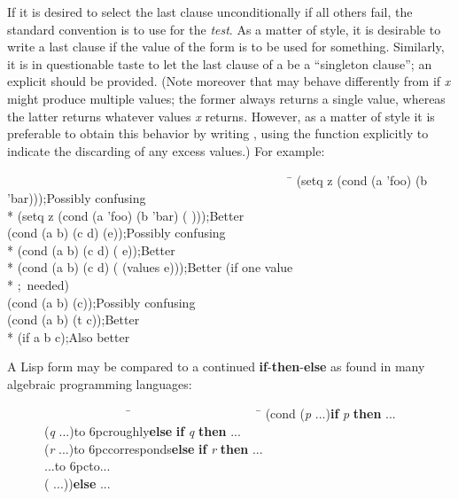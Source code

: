 \begin{defmac}
If it is desired to select the last clause unconditionally if all others
fail, the standard convention is to use {\true} for the \emph{test}.
As a matter of style, it is desirable to write a last clause
\cd{({\true} {\false})} if the value of the  form is to be used
for something.  Similarly, it is in questionable
taste to let the last clause of
a  be a ``singleton clause''; an explicit {\true} should be provided.
(Note moreover that  may behave differently from
 if \emph{x} might produce multiple values;
the former always returns a single value, whereas the latter returns whatever
values \emph{x} returns.  However, as a matter of style it is preferable
to obtain this behavior by writing ,
using the  function explicitly to indicate the discarding
of any excess values.)
For example:
\begin{lisp}
~~~~~~~~~~~~~~~~~~~~~~~~~~~~~~~~~~~~~~~~~~~~~~\=\kill
(setq z (cond (a 'foo) (b 'bar)))\>;\textrm{Possibly confusing} \\*
(setq z (cond (a 'foo) (b 'bar) ({\true} {\false})))\>;\textrm{Better} \\
(cond (a b) (c d) (e))\>;\textrm{Possibly confusing} \\*
(cond (a b) (c d) ({\true} e))\>;\textrm{Better} \\*
(cond (a b) (c d) ({\true} (values e)))\>;\textrm{Better (if one value} \\*
                                       \>;~\textrm{needed)} \\
(cond (a b) (c))\>;\textrm{Possibly confusing} \\
(cond (a b) (t c))\>;\textrm{Better} \\*
(if a b c)\>;\textrm{Also better}
\end{lisp}
A Lisp  form may be compared to a continued \textbf{if}-\textbf{then}-\textbf{else}
as found in many algebraic programming languages:
\begin{lisp}
~~~~~~~~~~~~~~~~~~~~\=~~~~~~~~~~~~~~~~~~~~~\=\kill
(cond (\emph{p} ...)\>\>\textbf{if} \emph{p} \textbf{then} ... \\
~~~~~~(\emph{q} ...)\>\hbox to 6pc{\hss\rm roughly\hss}\>\textbf{else} \textbf{if} \emph{q} \textbf{then} ... \\
~~~~~~(\emph{r} ...)\>\hbox to 6pc{\hss\rm corresponds\hss}\>\textbf{else} \textbf{if} \emph{r} \textbf{then} ... \\
~~~~~~...\>\hbox to 6pc{\hss\rm to\hss}\>... \\
~~~~~~({\true} ...))\>\>\textbf{else} ...
\end{lisp}
\end{defmac}


